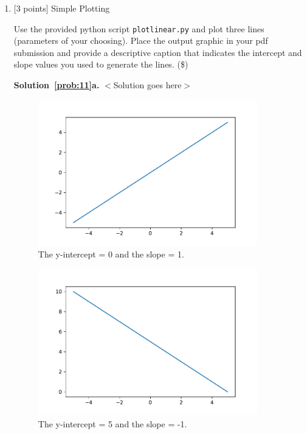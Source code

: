 \documentclass[10pt]{article}
\begin{document}
\begin{enumerate}
\item \label{prob:11} [3 points] Simple Plotting

Use the provided python script {\tt plotlinear.py} and plot three lines (parameters of your choosing).  Place the output graphic in your pdf submission and provide a descriptive caption that indicates the intercept and slope values you used to generate the lines. (\$)

{\bf Solution~\ref{prob:11}a.} $<$Solution goes here$>$\\

\begin{figure}
\centering
\includegraphics[width=0.9\textwidth]{line_plot.pdf}
\caption{\label{fig:plot1}The y-intercept = 0 and the slope = 1.}
\end{figure}

\begin{figure}
\centering
\includegraphics[width=0.9\textwidth]{line_plot2.pdf}
\caption{\label{fig:plot2}The y-intercept = 5 and the slope = -1.}
\end{figure}


\end{enumerate}
\end{document}
